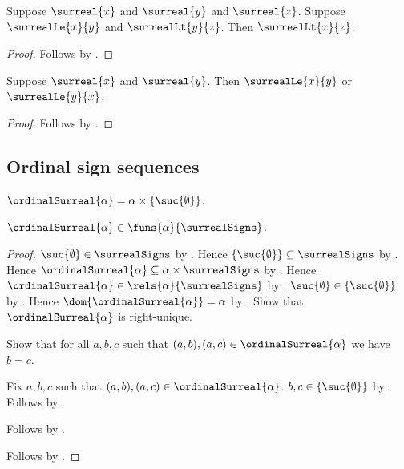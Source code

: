\begin{corollary}\label{surreal_le_lt_transitive}
    Suppose $\surreal{x}$ and $\surreal{y}$ and $\surreal{z}$.
    Suppose $\surrealLe{x}{y}$ and $\surrealLt{y}{z}$.
    Then $\surrealLt{x}{z}$.
\end{corollary}
\begin{proof}
    Follows by .
\end{proof}

\begin{theorem}\label{surreal_le_total}
    Suppose $\surreal{x}$ and $\surreal{y}$.
    Then $\surrealLe{x}{y}$ or $\surrealLe{y}{x}$.
\end{theorem}
\begin{proof}
    Follows by .
\end{proof}

\subsection{Ordinal sign sequences}

\begin{definition}\label{ordinal_surreal}
    $\ordinalSurreal{\alpha}=\alpha\times\{\suc{\emptyset}\}$.
\end{definition}

\begin{lemma}\label{ordinal_surreal_function}
    $\ordinalSurreal{\alpha}\in
        \funs{\alpha}{\surrealSigns}$.
\end{lemma}
\begin{proof}
    $\suc{\emptyset}\in\surrealSigns$
        by .
    Hence $\{\suc{\emptyset}\}\subseteq\surrealSigns$
        by .
    Hence $\ordinalSurreal{\alpha}\subseteq
        \alpha\times\surrealSigns$
        by .
    Hence $\ordinalSurreal{\alpha}\in
        \rels{\alpha}{\surrealSigns}$
        by .
    $\suc{\emptyset}\in\{\suc{\emptyset}\}$
        by .
    Hence $\dom{\ordinalSurreal{\alpha}}=\alpha$
        by .
    Show that $\ordinalSurreal{\alpha}$ is right-unique.
    \begin{subproof}
        Show that for all $a,b,c$ such that
            $(a,b),(a,c)\in\ordinalSurreal{\alpha}$ we have $b=c$.
        \begin{subproof}
            Fix $a,b,c$ such that
                $(a,b),(a,c)\in\ordinalSurreal{\alpha}$.
            $b,c\in\{\suc{\emptyset}\}$
                by .
            Follows by .
        \end{subproof}
        Follows by .
    \end{subproof}
    Follows by .
\end{proof}

